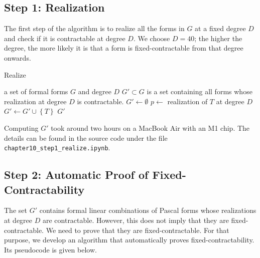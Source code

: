 \subsection*{Step 1: Realization}

The first step of the algorithm is to realize all the forms in \( G \) at a fixed degree \( D \) and check if it is contractable at degree \( D \). We choose \( D = 40 \); the higher the degree, the more likely it is that a form is fixed-contractable from that degree onwards. 


\begin{algorithm}[H]
    \caption{Realize}
    \label{alg:realize}
    \begin{algorithmic}[1]
    \Require a set of formal forms $G$ and degree \( D \)
\Ensure $G' \subset G$ is a set containing all forms whose realization at degree \( D \) is contractable.
    \State \( G' \gets \emptyset \)
        \State \( p \gets  \) realization of \( T \) at degree \( D \)
            \State $G' \gets G' \cup \left\{ T \right\}$
        \EndIf        
    \EndFor
    \State \Return $G'$
\EndFunction
\end{algorithmic}
\end{algorithm}

Computing \( G' \) took around two hours on a MacBook Air with an M1 chip. The details can be found in the source code \cite{ducrepo} under the file \texttt{chapter10\_step1\_realize.ipynb}.

\subsection*{Step 2: Automatic Proof of Fixed-Contractability}

The set \( G' \) contains formal linear combinations of Pascal forms whose realizations at degree \( D \) are contractable. However, this does not imply that they are fixed-contractable. We need to prove that they are fixed-contractable. For that purpose, we develop an algorithm that automatically proves fixed-contractability. Its pseudocode is given below.

